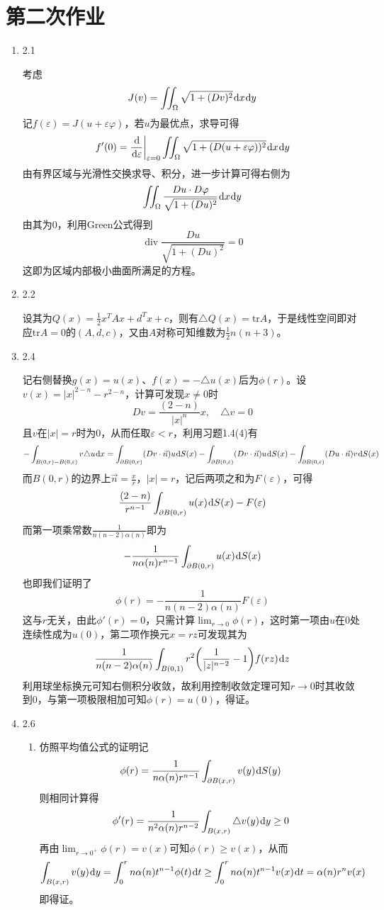 \documentclass[a4paper,UTF8,fontset=windows,10pt]{ctexart}
\newcommand*{\dr}{\hspace{0.07em}\mathrm{d}}
\DeclareMathOperator*{\di}{div}
\begin{document}
\section{第二次作业}
\begin{enumerate}
    \item 2.1
    
    考虑
    $$J(v)=\iint_\Omega\sqrt{1+(Dv)^2}\dr x\dr y$$
    记$f(\varepsilon)=J(u+\varepsilon\varphi)$，若$u$为最优点，求导可得
    $$f'(0)=\frac{\dr}{\dr\varepsilon}\bigg|_{\varepsilon=0}\iint_\Omega\sqrt{1+(D(u+\varepsilon\varphi))^2}\dr x\dr y$$
    由有界区域与光滑性交换求导、积分，进一步计算可得右侧为
    $$\iint_\Omega\frac{Du\cdot D\varphi}{\sqrt{1+(Du)^2}}\dr x\dr y$$
    由其为0，利用Green公式得到
    $$\di\frac{Du}{\sqrt{1+(Du)^2}}=0$$
    这即为区域内部极小曲面所满足的方程。
    
    \item 2.2
    
    设其为$Q(x)=\frac{1}{2}x^TAx+d^Tx+c$，则有$\triangle Q(x)=\mathrm{tr}A$，于是线性空间即对应$\mathrm{tr}A=0$的$(A,d,c)$，又由$A$对称可知维数为$\frac{1}{2}n(n+3)$。
    
    \item 2.4
    
    记右侧替换$g(x)=u(x)$、$f(x)=-\triangle u(x)$后为$\phi(r)$。设$v(x)=|x|^{2-n}-r^{2-n}$，计算可发现$x\ne0$时
    $$Dv=\frac{(2-n)}{|x|^n}x,\quad\triangle v=0$$
    且$v$在$|x|=r$时为0，从而任取$\varepsilon<r$，利用习题1.4(4)有
    $$-\int_{B(0,r)-B(0,\varepsilon)}v\triangle u\dr x=\int_{\partial B(0,r)}(Dv\cdot\vec{n})u\dr S(x)-\int_{\partial B(0,\varepsilon)}(Dv\cdot\vec{n})u\dr S(x)-\int_{\partial B(0,\varepsilon)}(Du\cdot\vec{n})v\dr S(x)$$
    而$B(0,r)$的边界上$\vec{n}=\frac{x}{r}$，$|x|=r$，记后两项之和为$F(\varepsilon)$，可得
    $$\frac{(2-n)}{r^{n-1}}\int_{\partial B(0,r)}u(x)\dr S(x)-F(\varepsilon)$$
    而第一项乘常数$\frac{1}{n(n-2)\alpha(n)}$即为
    $$-\frac{1}{n\alpha(n)r^{n-1}}\int_{\partial B(0,r)}u(x)\dr S(x)$$
    也即我们证明了
    $$\phi(r)=-\frac{1}{n(n-2)\alpha(n)}F(\varepsilon)$$
    这与$r$无关，由此$\phi'(r)=0$，只需计算$\lim_{r\to0}\phi(r)$，这时第一项由$u$在0处连续性成为$u(0)$，第二项作换元$x=rz$可发现其为
    $$\frac{1}{n(n-2)\alpha(n)}\int_{B(0,1)}r^2\bigg(\frac{1}{|z|^{n-2}}-1\bigg)f(rz)\dr z$$
    利用球坐标换元可知右侧积分收敛，故利用控制收敛定理可知$r\to0$时其收敛到0，与第一项极限相加可知$\phi(r)=u(0)$，得证。
    
    \item 2.6
    \begin{enumerate}[(1)]
        \item 仿照平均值公式的证明记
        $$\phi(r)=\frac{1}{n\alpha(n)r^{n-1}}\int_{\partial B(x,r)}v(y)\dr S(y)$$
        则相同计算得
        $$\phi'(r)=\frac{1}{n^2\alpha(n)r^{n-2}}\int_{B(x,r)}\triangle v(y)\dr y\ge0$$
        再由$\lim_{r\to 0^+}\phi(r)=v(x)$可知$\phi(r)\ge v(x)$，从而
        $$\int_{B(x,r)}v(y)\dr y=\int_0^rn\alpha(n)t^{n-1}\phi(t)\dr t\ge\int_0^rn\alpha(n)t^{n-1}v(x)\dr t=\alpha(n)r^nv(x)$$
        即得证。
    

\end{enumerate}
\end{enumerate}
\end{document}
